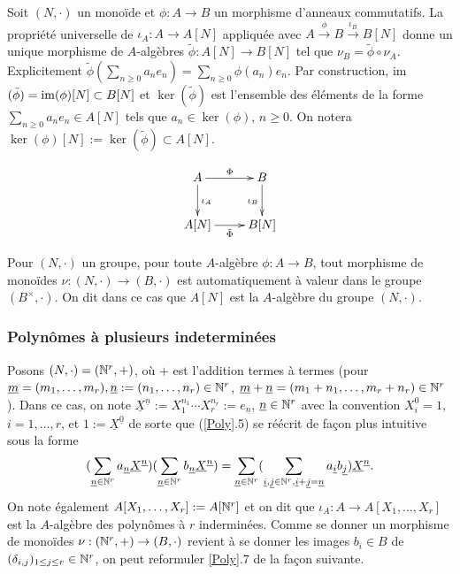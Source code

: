 Soit $(N,\cdot)$ un monoïde et $\phi: A\rightarrow B$ un morphisme d'anneaux
commutatifs. La propriété universelle de $\iota_A:A\rightarrow A[N]$ appliquée
avec $A\stackrel{\phi}{\rightarrow} B\stackrel{\iota_B}{\rightarrow} B[N]$
donne un unique morphisme de $A$-algèbres $\tilde{\phi}:A[N]\rightarrow B[N]$
tel que $\nu_B=\tilde{\phi}\circ \nu_A$. Explicitement
$\tilde{\phi}(\sum_{n\geq 0}a_ne_n)=\sum_{n\geq 0}\phi(a_n)e_n$.  Par
construction, im$(\tilde{\phi})=\operatorname{im}(\phi)[N]\subset B[N]$ et
$\ker(\tilde{\phi})$ est l'ensemble des éléments de la forme $\sum_{n\geq
0}a_ne_n\in A[N]$ tels que $a_n\in \ker(\phi)$, $n\geq 0$. On notera
$\ker(\phi)[N]:=\ker(\tilde{\phi})\subset A[N]$.

\[\xymatrix{ A\ar[r]^\Phi \ar[d]^{\iota_A} & B \ar[d]_{\iota_B} \\
A[N]\ar[r]_{\tilde{\Phi} } & B[N] }\]

\begin{definition}
    Pour $(N,\cdot)$ un groupe, pour toute $A$-algèbre $\phi:A\rightarrow B$,
    tout morphisme de monoïdes $\nu:(N,\cdot)\rightarrow (B,\cdot)$ est
    automatiquement à valeur dans le groupe $(B^\times,\cdot)$. On dit dans ce
    cas que $ A[N]$ est la $A$-algèbre du groupe $(N,\cdot)$.
\end{definition}

\subsubsection{Polynômes à plusieurs indeterminées}

Posons $(N,\cdot)=(\mathbb{N}^r,+)$, où $+$ est l'addition termes à termes (pour
$\underline{m}=(m_1,\dots,m_r), \underline{n}:=(n_1,\dots, n_r)\in \mathbb{N}^r$,
$\underline{m}+\underline{n}=(m_1+n_1,\dots,m_r+n_r)\in \mathbb{N}^r$). Dans ce cas, on
note $\underline{X}^{\underline{n}}:=X_1^{n_1}\cdots
X_r^{n_r}:=e_{\underline{n}}$, $\underline{n}\in \mathbb{N}^r$ avec la convention
$X_i^0=1$, $i=1,\dots, r$,  et $1:=\underline{X}^{\underline{0}}$ de sorte que
(\ref{Poly}.5) se réécrit de façon plus intuitive sous la forme $$
(\sum_{\underline{n}\in\mathbb{N}^r}a_{\underline{n}}\underline{X}^{\underline{n}})
(\sum_{\underline{n}\in
\mathbb{N}^r}b_{\underline{n}}\underline{X}^{\underline{n}})=\sum_{\underline{n}\in
\mathbb{N}^r}(\sum_{\underline{i},\underline{j}\in \mathbb{N}^r,
\underline{i}+\underline{j}=\underline{n}}a_{\underline{i}}b_{\underline{j}})\underline{X}^{\underline{n}}.$$
On note également $A[X_1,\dots, X_r]:=A[\mathbb{N}^r]$ et on dit que
$\iota_A:A\rightarrow A[X_1,\dots, X_r]$ est la $A$-algèbre des polynômes à $r$
inderminées. Comme se donner un morphisme de monoïdes $\nu:(\mathbb{N}^r,+)\rightarrow
(B ,\cdot)$ revient à se donner les images $b_i\in B $ de
$(\delta_{i,j})_{1\leq j\leq r}\in \mathbb{N}^r$, on peut reformuler \ref{Poly}.7 de la
façon suivante.


